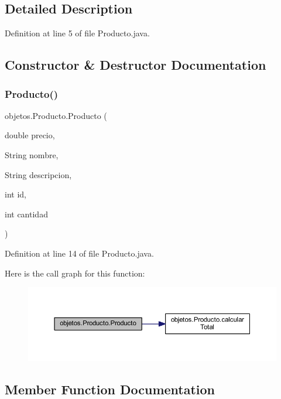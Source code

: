 \subsection{Detailed Description}


Definition at line 5 of file Producto.\+java.



\subsection{Constructor \& Destructor Documentation}
\mbox{\label{classobjetos_1_1_producto_a2944862f9387c43686583f85fdb9f79f}} 
\subsubsection{\texorpdfstring{Producto()}{Producto()}}
{\footnotesize\ttfamily objetos.\+Producto.\+Producto (\begin{DoxyParamCaption}\item[{double}]{precio,  }\item[{String}]{nombre,  }\item[{String}]{descripcion,  }\item[{int}]{id,  }\item[{int}]{cantidad }\end{DoxyParamCaption})}



Definition at line 14 of file Producto.\+java.

Here is the call graph for this function\+:
\nopagebreak
\begin{figure}[H]
\begin{center}
\leavevmode
\includegraphics[width=350pt]{classobjetos_1_1_producto_a2944862f9387c43686583f85fdb9f79f_cgraph}
\end{center}
\end{figure}


\subsection{Member Function Documentation}
\mbox{\label{classobjetos_1_1_producto_aca1868670a4e90738389af3bb5fa3e00}} 

